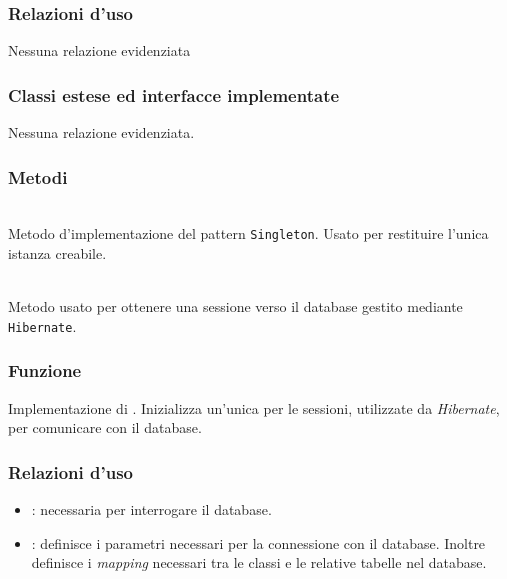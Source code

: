 \subsubsection*{Relazioni d'uso}

Nessuna relazione evidenziata

\subsubsection*{Classi estese ed interfacce implementate}

Nessuna relazione evidenziata.


\subsubsection*{Metodi}
\begin{description}
	\item{}\\
	Metodo d'implementazione del pattern \texttt{Singleton}. Usato per restituire l'unica istanza creabile.
	\item{}\\
	Metodo usato per ottenere una sessione verso il database gestito mediante \texttt{Hibernate}.
\end{description}


\subsubsection*{Funzione}
Implementazione di . Inizializza un'unica  per le sessioni, utilizzate da \textit{Hibernate}, per comunicare con il database.

\subsubsection*{Relazioni d'uso}

\begin{itemize}
	\item {}: necessaria per interrogare il database.
	\item {}: definisce i parametri necessari per la connessione con il database. Inoltre definisce i \textit{mapping} necessari tra le classi  e le relative tabelle nel database.
\end{itemize}

